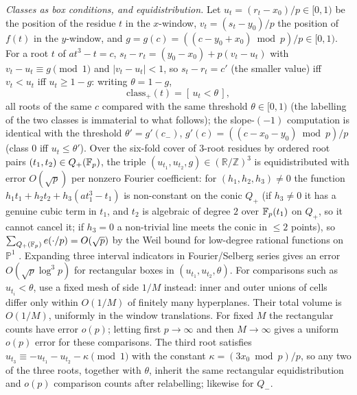 \smallskip\noindent\emph{Classes as box conditions, and equidistribution.} Let $u_t=(r_t-x_0)/p\in[0,1)$ be the
position of the residue $t$ in the $x$-window, $v_t=(s_t-y_0)/p$ the position of $f(t)$ in the $y$-window, and
$g=g(c)=((c-y_0+x_0)\bmod p)/p\in[0,1)$. For a root $t$ of $at^3-t=c$, $s_t-r_t=(y_0-x_0)+p(v_t-u_t)$ with
$v_t-u_t\equiv g\pmod1$ and $|v_t-u_t|<1$, so $s_t-r_t=c'$ (the smaller value) iff $v_t<u_t$ iff $u_t\ge1-g$:
writing $\theta=1-g$,
\[
\mathrm{class}_+(t)=[\,u_t<\theta\,],
\]
all roots of the same $c$ compared with the same threshold $\theta\in[0,1)$ (the labelling of the two classes is
immaterial to what follows); the slope-$(-1)$ computation is identical with the threshold $\theta'=g'(c_-)$,
$g'(c)=((c-x_0-y_0)\bmod p)/p$ (class $0$ iff $u_t\le\theta'$). Over the six-fold cover of $3$-root residues by ordered
root pairs $(t_1,t_2)\in Q_+(\mathbb{F}_p)$, the triple $(u_{t_1},u_{t_2},g)\in(\mathbb R/\mathbb Z)^3$ is equidistributed
with error $O(\sqrt p)$ per nonzero Fourier coefficient: for $(h_1,h_2,h_3)\ne0$ the function
$h_1t_1+h_2t_2+h_3(at_1^3-t_1)$ is non-constant on the conic $Q_+$ (if $h_3\ne0$ it has a genuine cubic term in
$t_1$, and $t_2$ is algebraic of degree $2$ over $\mathbb{F}_p(t_1)$ on $Q_+$, so it cannot cancel it; if $h_3=0$ a
non-trivial line meets the conic in $\le2$ points), so $\sum_{Q_+(\mathbb{F}_p)}e(\cdot/p)=O(\sqrt p)$ by the Weil bound for
low-degree rational functions on $\mathbb P^1$ \cite{IK}. Expanding three interval indicators in Fourier/Selberg series
\cite{Montgomery,Vaaler} gives an error $O(\sqrt p\log^3p)$ for rectangular boxes in $(u_{t_1},u_{t_2},\theta)$.
For comparisons such as $u_{t_i}<\theta$, use a fixed mesh of side $1/M$ instead: inner and outer unions of cells differ
only within $O(1/M)$ of finitely many hyperplanes.  Their total volume is $O(1/M)$, uniformly in the window translations.
For fixed $M$ the rectangular counts have error $o(p)$; letting first $p\to\infty$ and then $M\to\infty$ gives a uniform $o(p)$ error for these comparisons.
The third root satisfies
$u_{t_3}\equiv-u_{t_1}-u_{t_2}-\kappa\pmod1$ with the constant $\kappa=(3x_0\bmod p)/p$, so any two of the three
roots, together with $\theta$, inherit the same rectangular equidistribution and $o(p)$ comparison counts after relabelling; likewise for $Q_-$.

